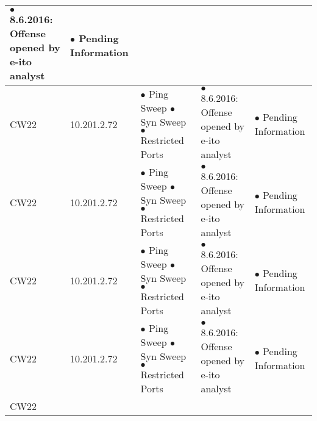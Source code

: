 \begin{center}
\begin{longtable}{|p{2cm}|p{}|p{4cm}|p{6cm}|p{4cm}|}
$\bullet$ 8.6.2016: Offense opened by e-ito analyst & %

$\bullet$ Pending Information %
\\
\hline %
CW22 & %

10.201.2.72 & %

$\bullet$ Ping Sweep \newline %
$\bullet$ Syn Sweep \newline
$\bullet$ Restricted Ports &

$\bullet$ 8.6.2016: Offense opened by e-ito analyst & %

$\bullet$ Pending Information %
\\
\hline %
CW22 & %

10.201.2.72 & %

$\bullet$ Ping Sweep \newline %
$\bullet$ Syn Sweep \newline
$\bullet$ Restricted Ports &

$\bullet$ 8.6.2016: Offense opened by e-ito analyst & %

$\bullet$ Pending Information %
\\
\hline %
CW22 & %

10.201.2.72 & %

$\bullet$ Ping Sweep \newline %
$\bullet$ Syn Sweep \newline
$\bullet$ Restricted Ports &

$\bullet$ 8.6.2016: Offense opened by e-ito analyst & %

$\bullet$ Pending Information %
\\
\hline %
CW22 & %

10.201.2.72 & %

$\bullet$ Ping Sweep \newline %
$\bullet$ Syn Sweep \newline
$\bullet$ Restricted Ports &

$\bullet$ 8.6.2016: Offense opened by e-ito analyst & %

$\bullet$ Pending Information %
\\
\hline %
CW22 & %


\end{longtable}
\end{center}

